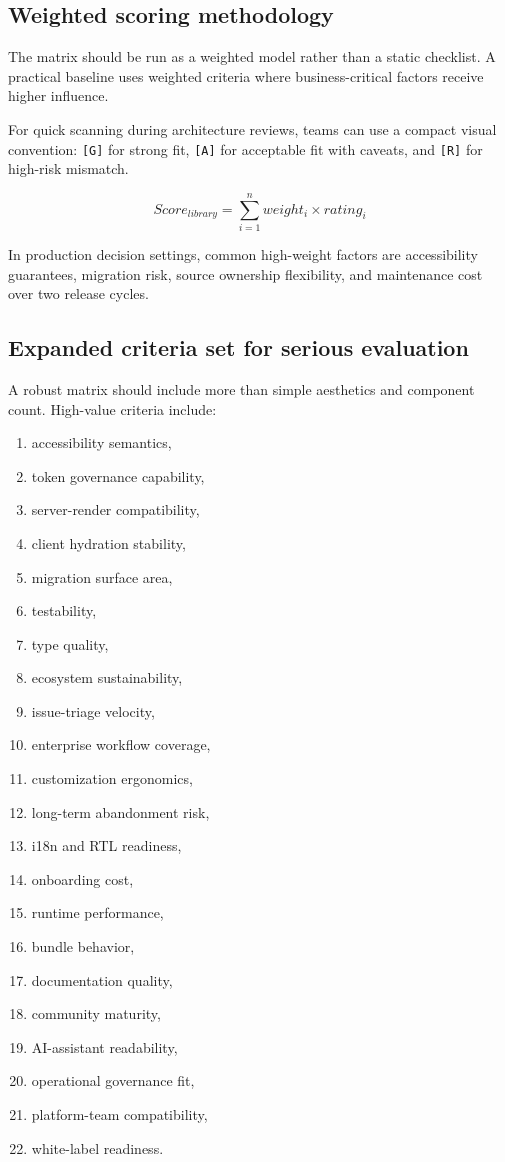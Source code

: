 \documentclass[11pt,twoside,a4paper]{article}
\begin{document}
\subsection{Weighted scoring methodology}
The matrix should be run as a weighted model rather than a static checklist. A practical baseline uses weighted criteria where business-critical factors receive higher influence.

For quick scanning during architecture reviews, teams can use a compact visual convention: \verb|[G]| for strong fit, \verb|[A]| for acceptable fit with caveats, and \verb|[R]| for high-risk mismatch.

$$
Score_{library} = \sum_{i=1}^{n} weight_i \times rating_i
$$

In production decision settings, common high-weight factors are accessibility guarantees, migration risk, source ownership flexibility, and maintenance cost over two release cycles.

\subsection{Expanded criteria set for serious evaluation}
A robust matrix should include more than simple aesthetics and component count. High-value criteria include:

\begin{enumerate}[leftmargin=*, itemsep=0.28em]
  \item accessibility semantics,
  \item token governance capability,
  \item server-render compatibility,
  \item client hydration stability,
  \item migration surface area,
  \item testability,
  \item type quality,
  \item ecosystem sustainability,
  \item issue-triage velocity,
  \item enterprise workflow coverage,
  \item customization ergonomics,
  \item long-term abandonment risk,
  \item i18n and RTL readiness,
  \item onboarding cost,
  \item runtime performance,
  \item bundle behavior,
  \item documentation quality,
  \item community maturity,
  \item AI-assistant readability,
  \item operational governance fit,
  \item platform-team compatibility,
  \item white-label readiness.
\end{enumerate}
\end{document}
